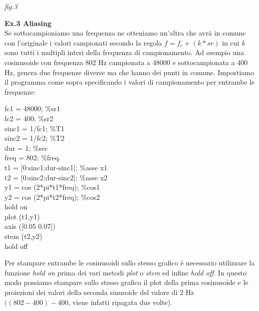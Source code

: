 \documentclass[11pt]{article}
\begin{document}
\begin{multicols*}{2}
\begin{center}
{\scriptsize \emph{fig.3 }}
\end{center}

\textbf{\textsf {Ex.3 Aliasing}}\\

\noindent Se sottocampioniamo una frequenza ne otteniamo un'altra che avrà in comune con l’originale i valori campionati secondo la regola $f = f_c + (k * sr)$ in cui \textit k sono tutti i multipli interi della frequenza di campionamento. Ad esempio una cosinusoide con frequenza 802 Hz campionata a 48000 e sottocampionata a 400 Hz, genera due frequenze diverse ma che hanno dei punti in comune. Impostiamo il programma come sopra specificando i valori di campionamento per entrambe le frequenze:

\begin{center}
\begin{minipage}[c]{6cm}
\begin{sffamily}

fc1 = 48000; \%sr1\\
fc2 = 400; \%sr2\\
sinc1 = 1/fc1; \%T1\\
sinc2 = 1/fc2; \%T2\\
dur = 1;  \%sec\\
freq = 802;  \%freq.\\
t1 = [0:sinc1:dur-sinc1]; \%asse x1\\
t2 = [0:sinc2:dur-sinc2]; \%asse x2\\
y1 = cos (2*pi*t1*freq); \%cos1\\
y2 = cos (2*pi*t2*freq); \%cos2\\
hold on\\
plot (t1,y1)\\
axis ([0.05 0.07])\\
stem (t2,y2) \\
hold off\\

\end{sffamily}
\end{minipage}
\end{center}

\noindent Per stampare entrambe le cosinusoidi sullo stesso grafico è necessario utilizzare la funzione \textit {hold on} prima dei vari metodi \textit {plot} o \textit {stem} ed infine \textit {hold off}. In questo modo possiamo stampare sullo stesso grafico il plot della prima cosinusoide e le proiezioni dei valori della seconda sinusoide del valore di 2 Hz $((802 - 400)-400$, viene infatti ripagata due volte).


\end{multicols*}
\end{document}
